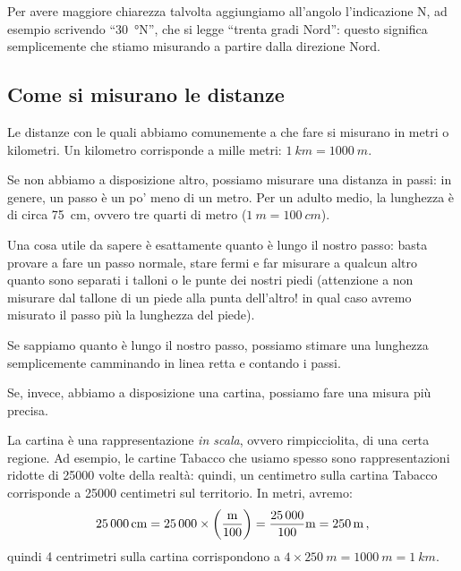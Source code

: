 \documentclass[12pt]{article}
\begin{document}
Per avere maggiore chiarezza talvolta aggiungiamo all'angolo l'indicazione N, ad esempio scrivendo ``\SI{30}{\degree}N'', che si legge ``trenta gradi Nord'': questo significa semplicemente che stiamo misurando a partire dalla direzione Nord. 


\subsection*{Come si misurano le distanze}

Le distanze con le quali abbiamo comunemente a che fare si misurano in metri o kilometri. 
Un kilometro corrisponde a mille metri: \(\SI{1}{km} = \SI{1000}{m}\). 

Se non abbiamo a disposizione altro, possiamo misurare una distanza in passi: in genere, un passo è un po' meno di un metro. Per un adulto medio, la lunghezza è di circa \SI{75}{cm}, ovvero tre quarti di metro (\(\SI{1}{m }  = \SI{100}{cm}\)).

Una cosa utile da sapere è esattamente quanto è lungo il nostro passo: basta provare a fare un passo normale, stare fermi e far misurare a qualcun altro quanto sono separati i talloni o le punte dei nostri piedi (attenzione a non misurare dal tallone di un piede alla punta dell'altro! in qual caso avremo misurato il passo più la lunghezza del piede). 

Se sappiamo quanto è lungo il nostro passo, possiamo stimare una lunghezza semplicemente camminando in linea retta e contando i passi. 

Se, invece, abbiamo a disposizione una cartina, possiamo fare una misura più precisa. 

La cartina è una rappresentazione \emph{in scala}, ovvero rimpicciolita, di una certa regione. Ad esempio, le cartine Tabacco che usiamo spesso sono rappresentazioni ridotte di \num{25000} volte della realtà: quindi, un centimetro sulla cartina Tabacco corrisponde a \num{25000} centimetri sul territorio. In metri, avremo: 
%
\begin{align}
\SI{25000}{cm} = \num{25000} \times \qty(\frac{\SI{}{m}}{100}) = \frac{\num{25000}}{100} \SI{}{m} = \SI{250}{m}
\,,
\end{align}
%
quindi 4 centrimetri sulla cartina corrispondono a \(4 \times \SI{250}{m} = \SI{1000}{m} = \SI{1}{km}\). 
\end{document}
